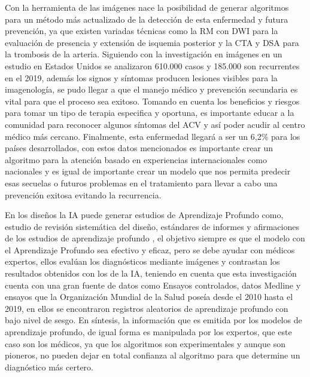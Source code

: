 \par Con la herramienta de las imágenes nace la posibilidad de generar algoritmos para un método más actualizado de la detección de esta enfermedad y futura prevención, ya que existen variadas técnicas \cite{Wintermark2013} como la RM con DWI para la evaluación de presencia y extensión de isquemia posterior y la CTA y DSA para la trombosis de la arteria. Siguiendo con la investigación en imágenes en un estudio en Estados Unidos \cite{Garcia2019} se analizaron 610.000 casos y 185.000 son recurrentes en el 2019, además los signos y síntomas producen lesiones visibles para la imagenología, se pudo llegar a que el manejo médico y prevención secundaria es vital para que el proceso sea exitoso. Tomando en cuenta los beneficios y riesgos para tomar un tipo de terapia especifica y oportuna, es importante educar a la comunidad para reconocer algunos síntomas del ACV y así poder acudir al centro médico más cercano. Finalmente, esta enfermedad llegará a ser un 6,2\% para los países desarrollados, con estos datos mencionados es importante crear un algoritmo para la atención basado en experiencias internacionales como nacionales \cite{Garcia2019} y es igual de importante crear un modelo que nos permita predecir esas secuelas o futuros problemas en el tratamiento para llevar a cabo una prevención exitosa evitando la recurrencia.\\
\par En los diseños la IA puede generar estudios de Aprendizaje Profundo como,  estudio de revisión sistemática del diseño, estándares de informes y afirmaciones de los estudios de aprendizaje profundo \cite{Pang2017}, el objetivo siempre es que el modelo con el Aprendizaje Profundo sea efectivo y eficaz, pero se debe ayudar con médicos expertos, ellos evalúan los diagnósticos mediante imágenes y contrastan los resultados obtenidos con los de la IA, teniendo en cuenta que esta investigación cuenta con una gran fuente de datos como Ensayos controlados, datos Medline y ensayos que la Organización Mundial de la Salud poseía desde el 2010 hasta el 2019, en ellos se encontraron registros aleatorios de aprendizaje profundo con bajo nivel de sesgo. En síntesis, la información que es emitida por los modelos de aprendizaje profundo, de igual forma es manipulada por los expertos, que este caso son los médicos, ya que los algoritmos \cite{Nagendran2020} son experimentales y aunque son pioneros, no pueden dejar en total confianza al algoritmo para que determine un diagnóstico más certero.\\
